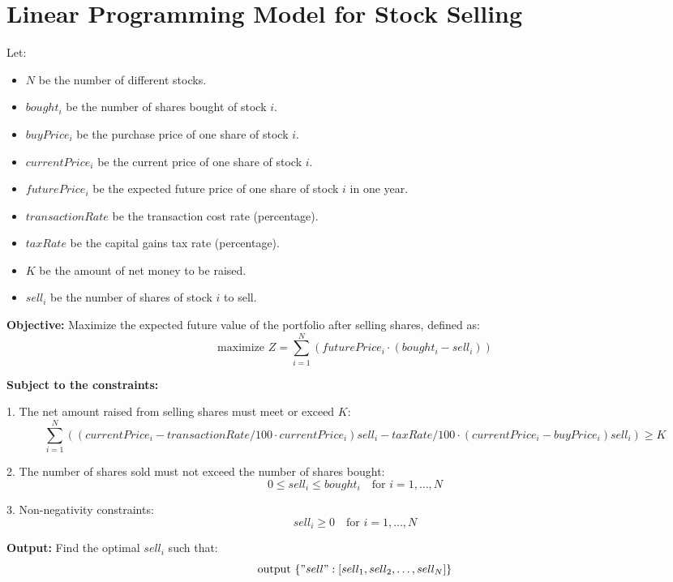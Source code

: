 \documentclass{article}
\begin{document}
\section*{Linear Programming Model for Stock Selling}

Let:
\begin{itemize}
    \item \( N \) be the number of different stocks.
    \item \( bought_i \) be the number of shares bought of stock \( i \).
    \item \( buyPrice_i \) be the purchase price of one share of stock \( i \).
    \item \( currentPrice_i \) be the current price of one share of stock \( i \).
    \item \( futurePrice_i \) be the expected future price of one share of stock \( i \) in one year.
    \item \( transactionRate \) be the transaction cost rate (percentage).
    \item \( taxRate \) be the capital gains tax rate (percentage).
    \item \( K \) be the amount of net money to be raised.
    \item \( sell_i \) be the number of shares of stock \( i \) to sell.
\end{itemize}

\textbf{Objective:}
Maximize the expected future value of the portfolio after selling shares, defined as:
\[
\text{maximize } Z = \sum_{i=1}^{N} (futurePrice_i \cdot (bought_i - sell_i)) 
\]

\textbf{Subject to the constraints:}

1. The net amount raised from selling shares must meet or exceed \( K \):
\[
\sum_{i=1}^{N} \left( (currentPrice_i - transactionRate/100 \cdot currentPrice_i)sell_i - taxRate/100 \cdot (currentPrice_i - buyPrice_i)sell_i \right) \geq K
\]

2. The number of shares sold must not exceed the number of shares bought:
\[
0 \leq sell_i \leq bought_i \quad \text{for } i = 1, \ldots, N
\]

3. Non-negativity constraints:
\[
sell_i \geq 0 \quad \text{for } i = 1, \ldots, N
\]

\textbf{Output:}
Find the optimal \( sell_i \) such that:
\[
\text{output } \{ "sell": [sell_1, sell_2, \ldots, sell_N] \}
\]
\end{document}
